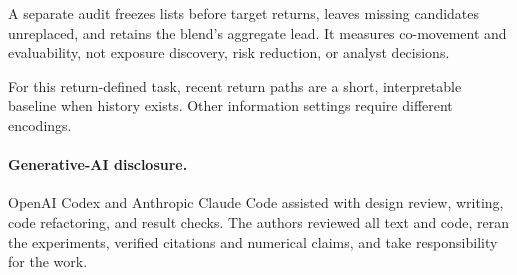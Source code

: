 \documentclass[sigconf,anonymous]{acmart}
\begin{document}
A separate audit freezes lists before target returns, leaves missing candidates
unreplaced, and retains the blend's aggregate lead.  It measures co-movement and
evaluability, not exposure discovery, risk reduction, or analyst decisions.

For this return-defined task, recent return paths are a short, interpretable
baseline when history exists.  Other information settings require different
encodings.

\paragraph{Generative-AI disclosure.}
OpenAI Codex and Anthropic Claude Code assisted with design review, writing,
code refactoring, and result checks.  The authors reviewed all text and code,
reran the experiments, verified citations and numerical claims, and take
responsibility for the work.



\end{document}
